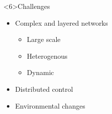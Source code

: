 \begin{frame}<6>{Challenges}
  \begin{card}
    \begin{itemize}
      \item<1-> Complex and layered networks
      \begin{itemize}
        \item <2->Large scale
        \item <3->Heterogenous
        \item <4->Dynamic
      \end{itemize}
      \item<5-> Distributed control
      \item<6-> Environmental changes
    \end{itemize}
  \end{card}
\end{frame}